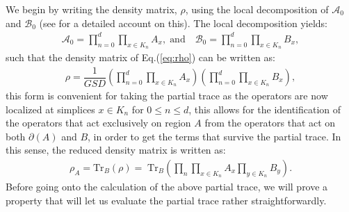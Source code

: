 \documentclass[%
nofootinbib,
 amsmath,amssymb,
aps,
]{revtex4-1}
\theoremstyle{plain}%
\theoremstyle{definition}
\theoremstyle{remark}
\begin{document}
We begin by writing the density matrix, \(\rho\), using the local decomposition of \(\mathcal{A}_0\) and \(\mathcal{B}_0\) (see \cite{higher} for a detailed account on this). The local decomposition yields:
\begin{align*}
\mathcal{A}_0 = \prod_{n=0}^{d} \prod_{x\in K_n} A_{x}, \; \text{and}\quad \mathcal{B}_0 = \prod_{n=0}^{d} \prod_{x\in K_n} B_{x},
\end{align*}
such that the density matrix of Eq.(\ref{eq:rho}) can be written as:
\begin{align*}
\rho = \dfrac{1}{GSD} \left(\prod_{n=0}^{d} \prod_{x\in K_n} A_{x}\right)\left(\prod_{n=0}^{d} \prod_{x\in K_n} B_{x}\right),
\end{align*}
this form is convenient for taking the partial trace as the operators are now localized at simplices $x \in K_n$ for $0\leq n \leq d$, this allows for the identification of the operators that act exclusively on region $A$ from the operators that act on both $\partial(A)$ and $B$, in order to get the terms that survive the partial trace.
In this sense, the reduced density matrix is written as:
\begin{align}\label{eq:rhoAlocal}
\rho_A = \text{Tr}_B(\rho)= \;\text{Tr}_B\left(\prod_n \prod_{x \in K_n}A_{x}\prod_{y \in K_n}B_{y}\right).
\end{align}
Before going onto the calculation of the above partial trace, we will prove a property that will let us evaluate the partial trace rather straightforwardly.
\end{document}
